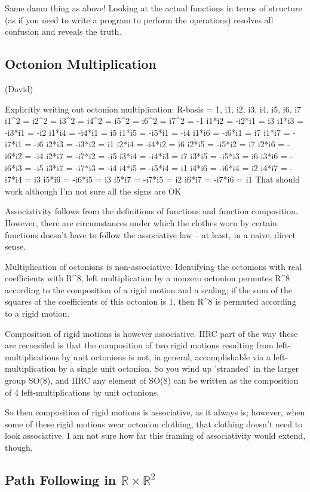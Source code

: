 \documentclass[12pt, letterpaper]{article}
\begin{document}
Same damn thing as above! Looking at the actual functions in terms of
structure (as if you need to write a program to perform the
operations) resolves all confusion and reveals the truth.

\subsection{Octonion Multiplication}

(David)

Explicitly writing out octonion multiplication:
R-basis = {1, i1, i2, i3, i4, i5, i6, i7}
i1^2 = i2^2 = i3^2 = i4^2 = i5^2 = i6^2 = i7^2 = -1
i1*i2 = -i2*i1 = i3
i1*i3 = -i3*i1 = -i2
i1*i4 = -i4*i1 = i5
i1*i5 = -i5*i1 = -i4
i1*i6 = -i6*i1 = i7
i1*i7 = -i7*i1 = -i6
i2*i3 = -i3*i2 = i1
i2*i4 = -i4*i2 = i6
i2*i5 = -i5*i2 = i7
i2*i6 = -i6*i2 = -i4
i2*i7 = -i7*i2 = -i5
i3*i4 = -i4*i3 = i7
i3*i5 = -i5*i3 = i6
i3*i6 = -i6*i3 = -i5
i3*i7 = -i7*i3 = -i4
i4*i5 = -i5*i4 = i1
i4*i6 = -i6*i4 = i2
i4*i7 = -i7*i4 = i3
i5*i6 = -i6*i5 = i3
i5*i7 = -i7*i5 = i2
i6*i7 = -i7*i6 = i1
That should work although I'm not sure all the signs are OK

Associativity follows from the definitions of functions and function
composition. However, there are circumstances under which the clothes
worn by certain functions doesn't have to follow the associative law
-- at least, in a naive, direct sense.

Multiplication of octonions is non-associative. Identifying the
octonions with real coefficients with R^8, left multiplication by a
nonzero octonion permutes R^8 according to the composition of a rigid
motion and a scaling; if the sum of the squares of the coefficients of
this octonion is 1, then R^8 is permuted according to a rigid
motion.

Composition of rigid motions is however associative.  IIRC part of the
way these are reconciled is that the composition of two rigid motions
resulting from left-multiplications by unit octonions is not, in
general, accomplishable via a left-multiplication by a single unit
octonion. So you wind up 'stranded' in the larger group SO(8), and
IIRC any element of SO(8) can be written as the composition of 4
left-multiplications by unit octonions.

So then composition of rigid motions is associative, as it always is;
however, when some of these rigid motions wear octonion clothing, that
clothing doesn't need to look associative. I am not sure how far this
framing of associativity would extend, though.


\subsection{Path Following in $\mathbb{R}\times\mathbb{R}^2$ }
\end{document}
